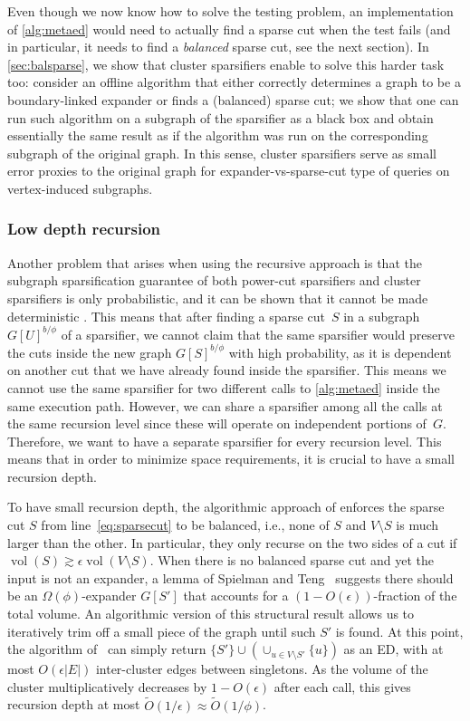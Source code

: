 \documentclass[epsfig,letter,11pt]{article}
\numberwithin{equation}{section}
\newcommand{\eps}{\epsilon}
\DeclareMathOperator{\vol}{vol}
\newcommand{\otil}{\tilde{O}}
\renewcommand{\tilde}{\widetilde}
\begin{document}
Even though we now know how to solve the testing problem, an implementation of \cref{alg:metaed} would need to actually find a sparse cut when the test fails (and in particular, it needs to find a \textit{balanced} sparse cut, see the next section). In \cref{sec:balsparse}, we show that cluster sparsifiers enable to solve this harder task too: consider an offline algorithm that either correctly determines a graph to be a boundary-linked expander or finds a (balanced) sparse cut; we show that one can run such algorithm on a subgraph of the sparsifier as a black box and obtain essentially the same result as if the algorithm was run on the corresponding subgraph of the original graph. In this sense, cluster sparsifiers serve as small error proxies to the original graph for expander-vs-sparse-cut type of queries on vertex-induced subgraphs.

\subsubsection*{Low depth recursion}
Another problem that arises when using the recursive approach is that the subgraph sparsification guarantee of both power-cut sparsifiers and cluster sparsifiers is only probabilistic, and it can be shown that it cannot be made deterministic \cite{streamexpdec}. This means that after finding a sparse cut~$S$ in a subgraph $G[U]^{b / \phi}$ of a sparsifier, we cannot claim that the same sparsifier would preserve the cuts inside the new graph $G[S]^{b / \phi}$ with high probability, as it is dependent on another cut that we have already found inside the sparsifier. This means we cannot use the same sparsifier for two different calls to \cref{alg:metaed} inside the same execution path.
However, we can share a sparsifier among all the calls at the same recursion level since these will operate on independent portions of~$G$. Therefore, we want to have a separate sparsifier for every recursion level. This means that in order to minimize space requirements, it is crucial to have a small recursion depth.

To have small recursion depth, the algorithmic approach of \cite{streamexpdec,triang,ChangPSZ21} enforces the sparse cut $S$ from line~\eqref{eq:sparsecut} to be balanced, i.e., none of $S$ and $V\setminus S$ is much larger than the other. In particular, they only recurse on the two sides of a cut if $\vol(S) \gtrsim \epsilon \vol(V \setminus S)$. 
When there is no balanced sparse cut and yet the input is not an expander, a lemma of Spielman and Teng~\cite{stspectral} suggests there should be an $\Omega(\phi)$-expander $G[S']$ that accounts for a $(1-O(\epsilon))$-fraction of the total volume. An algorithmic version of this structural result allows us to iteratively trim off a small piece of the graph until such $S'$ is found. At this point, the algorithm of~\cite{streamexpdec} can simply return $\{S'\} \cup (\cup_{u \in V \setminus S'} \{u\})$ as an ED, with at most $O(\epsilon|E|)$ inter-cluster edges between singletons. As the volume of the cluster multiplicatively decreases by $1 - O(\eps)$ after each call, this gives recursion depth at most $\otil(1/\epsilon) \approx \otil(1/\phi)$.
\end{document}
